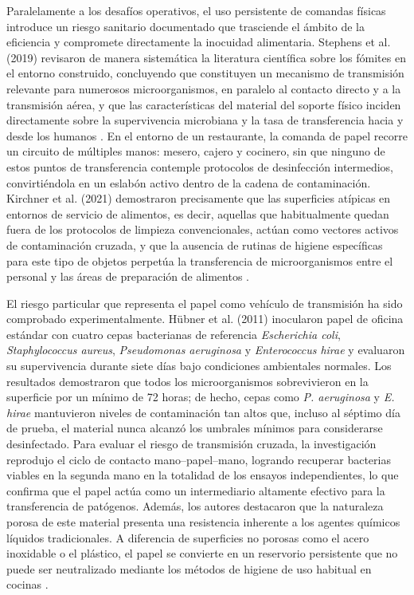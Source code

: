 Paralelamente a los desafíos operativos, el uso persistente de comandas físicas introduce un riesgo sanitario documentado que trasciende el ámbito de la eficiencia y compromete directamente la inocuidad alimentaria. Stephens et al. (2019) revisaron de manera sistemática la literatura científica sobre los fómites en el entorno construido, concluyendo que constituyen un mecanismo de transmisión relevante para numerosos microorganismos, en paralelo al contacto directo y a la transmisión aérea, y que las características del material del soporte físico inciden directamente sobre la supervivencia microbiana y la tasa de transferencia hacia y desde los humanos \cite{Stephens2019}. En el entorno de un restaurante, la comanda de papel recorre un circuito de múltiples manos: mesero, cajero y cocinero, sin que ninguno de estos puntos de transferencia contemple protocolos de desinfección intermedios, convirtiéndola en un eslabón activo dentro de la cadena de contaminación. Kirchner et al. (2021) demostraron precisamente que las superficies atípicas en entornos de servicio de alimentos, es decir, aquellas que habitualmente quedan fuera de los protocolos de limpieza convencionales, actúan como vectores activos de contaminación cruzada, y que la ausencia de rutinas de higiene específicas para este tipo de objetos perpetúa la transferencia de microorganismos entre el personal y las áreas de preparación de alimentos \cite{Kirchner2021}.

El riesgo particular que representa el papel como vehículo de transmisión ha sido comprobado experimentalmente. Hübner et al. (2011) inocularon papel de oficina estándar con cuatro cepas bacterianas de referencia \textit{Escherichia coli}, \textit{Staphylococcus aureus}, \textit{Pseudomonas aeruginosa} y \textit{Enterococcus hirae} y evaluaron su supervivencia durante siete días bajo condiciones ambientales normales. Los resultados demostraron que todos los microorganismos sobrevivieron en la superficie por un mínimo de 72 horas; de hecho, cepas como \textit{P. aeruginosa} y \textit{E. hirae} mantuvieron niveles de contaminación tan altos que, incluso al séptimo día de prueba, el material nunca alcanzó los umbrales mínimos para considerarse desinfectado. Para evaluar el riesgo de transmisión cruzada, la investigación reprodujo el ciclo de contacto mano--papel--mano, logrando recuperar bacterias viables en la segunda mano en la totalidad de los ensayos independientes, lo que confirma que el papel actúa como un intermediario altamente efectivo para la transferencia de patógenos. Además, los autores destacaron que la naturaleza porosa de este material presenta una resistencia inherente a los agentes químicos líquidos tradicionales. A diferencia de superficies no porosas como el acero inoxidable o el plástico, el papel se convierte en un reservorio persistente que no puede ser neutralizado mediante los métodos de higiene de uso habitual en cocinas \cite{Huebner2011}.

